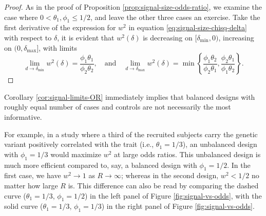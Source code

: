 \begin{proof}
	As in the proof of Proposition \ref{prop:signal-size-odds-ratio}, we examine the case where $0<\theta_1,\phi_1\le1/2$, and leave the other three cases an exercise.
	Take the first derivative of the expression for $w^2$ in equation \eqref{eq:signal-size-chisq-delta} with respect to $\delta$, it is evident that $w^2(\delta)$ is decreasing on $[\delta_\mathrm{min},0)$, increasing on $(0,\delta_\mathrm{max}]$, with limits
	$$
	\lim_{d\to \delta_\mathrm{min}} w^2(\delta) = \frac{\phi_1\theta_1}{\phi_2\theta_2},
	\quad
	\text{and}
	\quad
	\lim_{d\to \delta_\mathrm{max}} w^2(\delta) = \min\left\{\frac{\phi_1\theta_2}{\phi_2\theta_1}, \frac{\phi_2\theta_1}{\phi_1\theta_2}\right\}.
	$$
\end{proof}

Corollary \ref{cor:signal-limits-OR} immediately implies that balanced designs with roughly equal number of cases and controls are not necessarily the most informative.

For example, in a study where a third of the recruited subjects carry the genetic variant positively correlated with the trait (i.e., $\theta_1=1/3$), an unbalanced design with $\phi_1=1/3$ would maximize $w^2$ at large odds ratios.
This unbalanced design is much more efficient compared to, say, a balanced design with $\phi_1=1/2$.
In the first case, we have $w^2\to1$ as $R\to\infty$; whereas in the second design, $w^2<1/2$ no matter how large $R$ is.
This difference can also be read by comparing the dashed curve ($\theta_1=1/3$, $\phi_1=1/2$) in the left panel of Figure \ref{fig:signal-vs-odds}, with the solid curve ($\theta_1=1/3$, $\phi_1=1/3$) in the right panel of Figure \ref{fig:signal-vs-odds}.
